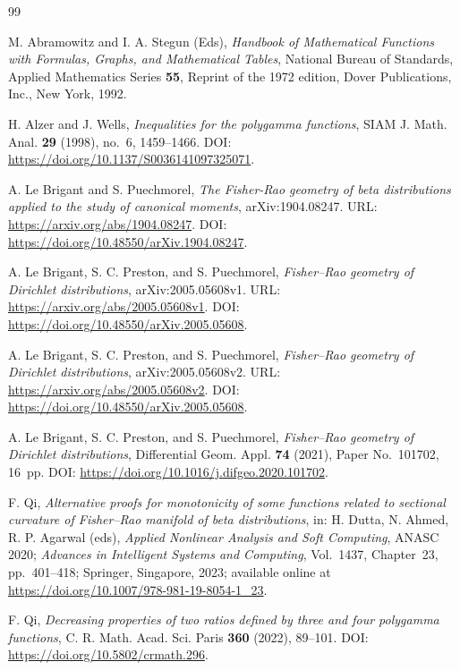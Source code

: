 \documentclass[reqno]{amsart}%
\theoremstyle{plain}
\theoremstyle{remark}
\begin{document}
\begin{thebibliography}{99}

M. Abramowitz and I. A. Stegun (Eds), \textit{Handbook of Mathematical Functions with Formulas, Graphs, and Mathematical Tables}, National Bureau of Standards, Applied Mathematics Series \textbf{55}, Reprint of the 1972 edition, Dover Publications, Inc., New York, 1992.

H. Alzer and J. Wells, \emph{Inequalities for the polygamma functions}, SIAM J. Math. Anal. \textbf{29} (1998), no.~6, 1459\nobreakdash--1466. DOI: \url{https://doi.org/10.1137/S0036141097325071}.

A. Le Brigant and S. Puechmorel, \textit{The Fisher-Rao geometry of beta distributions applied to the study of canonical moments}, arXiv:1904.08247. URL: \url{https://arxiv.org/abs/1904.08247}. DOI: \url{https://doi.org/10.48550/arXiv.1904.08247}.

A. Le Brigant, S. C. Preston, and S. Puechmorel, \emph{Fisher--Rao geometry of Dirichlet distributions}, arXiv:2005.05608v1. URL: \url{https://arxiv.org/abs/2005.05608v1}. DOI: \url{https://doi.org/10.48550/arXiv.2005.05608}.

A. Le Brigant, S. C. Preston, and S. Puechmorel, \emph{Fisher--Rao geometry of Dirichlet distributions}, arXiv:2005.05608v2. URL: \url{https://arxiv.org/abs/2005.05608v2}. DOI: \url{https://doi.org/10.48550/arXiv.2005.05608}.

A. Le Brigant, S. C. Preston, and S. Puechmorel, \emph{Fisher--Rao geometry of Dirichlet distributions}, Differential Geom. Appl. \textbf{74} (2021), Paper No.~101702, 16~pp. DOI: \url{https://doi.org/10.1016/j.difgeo.2020.101702}.

F. Qi, \textit{Alternative proofs for monotonicity of some functions related to sectional curvature of Fisher--Rao manifold of beta distributions}, in: H. Dutta, N. Ahmed, R. P. Agarwal (eds), \emph{Applied Nonlinear Analysis and Soft Computing}, ANASC 2020; \emph{Advances in Intelligent Systems and Computing}, Vol.~1437, Chapter~23, pp.~401\nobreakdash--418; Springer, Singapore, 2023; available online at \url{https://doi.org/10.1007/978-981-19-8054-1_23}.

F. Qi, \emph{Decreasing properties of two ratios defined by three and four polygamma functions}, C. R. Math. Acad. Sci. Paris \textbf{360} (2022), 89\nobreakdash--101. DOI: \url{https://doi.org/10.5802/crmath.296}.


\end{thebibliography}
\end{document}
